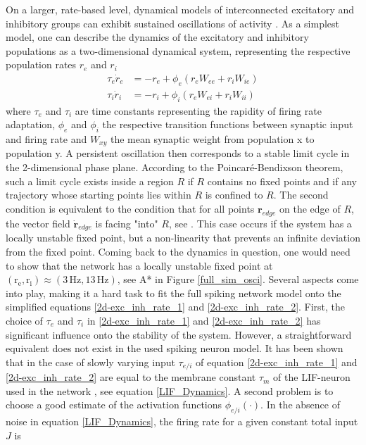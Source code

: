 \documentclass[10pt,a4paper]{article}
\begin{document}
On a larger, rate-based level, dynamical models of interconnected excitatory and inhibitory groups can exhibit sustained oscillations of activity \cite[p.~270]{Theor_Neur_Dayan}. As a simplest model, one can describe the dynamics of the excitatory and inhibitory populations as a two-dimensional dynamical system, representing the respective population rates $r_e$ and $r_i$
\begin{align}
\tau_e \dot{r}_e  &= -r_e + \phi_e(r_e W_{ee} + r_i W_{ie}) \label{2d-exc_inh_rate_1} \\
\tau_i \dot{r}_i  &= -r_i + \phi_i(r_e W_{ei} + r_i W_{ii}) \label{2d-exc_inh_rate_2}
\end{align}
where $\tau_e$ and $\tau_i$ are time constants representing the rapidity of firing rate adaptation, $\phi_e$ and $\phi_i$ the respective transition functions between synaptic input and firing rate and $W_{xy}$ the mean synaptic weight from population x to population y. A persistent oscillation then corresponds to a stable limit cycle in the 2-dimensional phase plane. According to the Poincaré-Bendixson theorem, such a limit cycle exists inside a region $R$ if $R$ contains no fixed points and if any trajectory whose starting points lies within $R$ is confined to $R$. The second condition is equivalent to the condition that for all points $\mathbf{r}_{edge}$ on the edge of $R$, the vector field $\dot{\mathbf{r}}_{edge}$ is facing "into" $R$, see \cite[p.~248]{Dyn_Sys_Hirsch}. This case occurs if the system has a locally unstable fixed point, but a non-linearity that prevents an infinite deviation from the fixed point.
Coming back to the dynamics in question, one would need to show that the network has a locally unstable fixed point at $\mathrm{(r_e,r_i)\approx (3\, Hz, 13\, Hz)}$, see A* in Figure \ref{full_sim_osci}. Several aspects come into play, making it a hard task to fit the full spiking network model onto the simplified equations \ref{2d-exc_inh_rate_1} and \ref{2d-exc_inh_rate_2}. First, the choice of $\tau_e$ and $\tau_i$ in \ref{2d-exc_inh_rate_1} and \ref{2d-exc_inh_rate_2} has significant influence onto the stability of the system. However, a straightforward equivalent does not exist in the used spiking neuron model. It has been shown that in the case of slowly varying input $\tau_{e/i}$ of equation \ref{2d-exc_inh_rate_1} and \ref{2d-exc_inh_rate_2} are equal to the membrane constant $\tau_m$ of the LIF-neuron used in the network \cite{Gerstner_Pop_Act}, see equation \ref{LIF_Dynamics}. A second problem is to choose a good estimate of the activation functions $\phi_{e/i}( \cdot )$. In the absence of noise in equation \ref{LIF_Dynamics}, the firing rate for a given constant total input $J$ is
\end{document}
